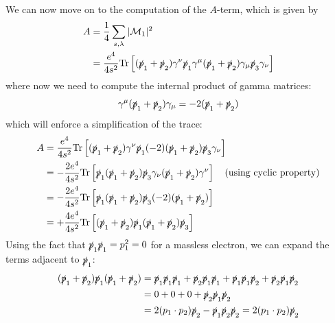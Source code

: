 We can now move on to the computation of the \(A\)-term, which is given by
\[
    \begin{aligned}
        A & = \frac{1}{4} \sum_{s, \lambda} \vert \mathcal{M}_1 \vert^2                                                                                                                         \\
          & = \frac{e^4}{4 s^2} \text{Tr}\left[ (\slashed{p}_1 + \slashed{p}_2) \gamma^\nu \slashed{p}_1 \gamma^\mu (\slashed{p}_1 + \slashed{p}_2) \gamma_\mu \slashed{p}_3 \gamma_\nu \right]
    \end{aligned}
\]
where now we need to compute the internal product of gamma matrices:
\[
    \gamma^{\mu} (\slashed{p}_1 + \slashed{p}_2) \gamma_\mu = -2(\slashed{p}_1 + \slashed{p}_2)
\]
which will enforce a simplification of the trace:
\[
    \begin{aligned}
        A & = \frac{e^4}{4 s^2} \text{Tr}\left[ (\slashed{p}_1 + \slashed{p}_2) \gamma^\nu \slashed{p}_1 (-2)(\slashed{p}_1 + \slashed{p}_2) \slashed{p}_3 \gamma_\nu \right]                                    \\
          & = -\frac{2e^4}{4 s^2} \text{Tr}\left[ \slashed{p}_1 (\slashed{p}_1 + \slashed{p}_2) \slashed{p}_3 \gamma_\nu (\slashed{p}_1 + \slashed{p}_2) \gamma^\nu \right] \quad (\text{using cyclic property}) \\
          & = -\frac{2e^4}{4 s^2} \text{Tr}\left[ \slashed{p}_1 (\slashed{p}_1 + \slashed{p}_2) \slashed{p}_3 (-2)(\slashed{p}_1 + \slashed{p}_2) \right]                                                        \\
          & = +\frac{4 e^4}{4 s^2} \text{Tr}\left[ (\slashed{p}_1 + \slashed{p}_2) \slashed{p}_1 (\slashed{p}_1 + \slashed{p}_2) \slashed{p}_3 \right]
    \end{aligned}
\]
Using the fact that $\slashed{p}_1 \slashed{p}_1 = p_1^2 = 0$ for a massless electron, we can expand the terms adjacent to $\slashed{p}_1$:
\[
    \begin{aligned}
        (\slashed{p}_1 + \slashed{p}_2) \slashed{p}_1 (\slashed{p}_1 + \slashed{p}_2) & = \slashed{p}_1 \slashed{p}_1 \slashed{p}_1 + \slashed{p}_2 \slashed{p}_1 \slashed{p}_1 + \slashed{p}_1 \slashed{p}_1 \slashed{p}_2 + \slashed{p}_2 \slashed{p}_1 \slashed{p}_2 \\
                                                                                      & = 0 + 0 + 0 + \slashed{p}_2 \slashed{p}_1 \slashed{p}_2                                                                                                                         \\
                                                                                      & = 2(p_1 \cdot p_2)\slashed{p}_2 - \slashed{p}_1 \slashed{p}_2 \slashed{p}_2 = 2(p_1 \cdot p_2)\slashed{p}_2
    \end{aligned}
\]
